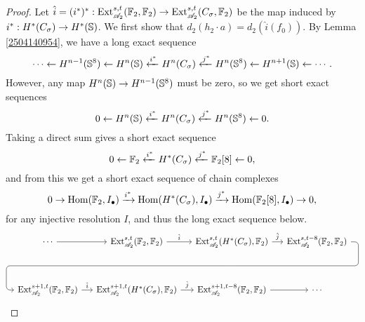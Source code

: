 \documentclass[11pt, titlepage]{article} %
\def\bb{\ensuremath\mathbb}
\def\A{\ensuremath{\mathscr{A}_2}}
\DeclareMathOperator{\Ext}{Ext}
\DeclareMathOperator{\Hom}{Hom}
\numberwithin{equation}{subsection}
\theoremstyle{plain}
\theoremstyle{definition}
\begin{document}
\begin{proof}
Let \(\hat i = (i^*)^* : \Ext_{\A}^{s,t}(\bb{F}_2, \bb{F}_2)\to \Ext_{\A}^{s,t}(C_\sigma, \bb{F}_2)\) be the map induced by \(i^* : H^*(C_\sigma)\to H^*(\bb{S})\). %
We first show that \(d_2(h_2\cdot a)=d_2(\hat i(f_0))\). By Lemma \ref{2504140954}, we have a long exact sequence
\[\cdots \leftarrow H^{n-1}(\bb{S}^8) \leftarrow H^n(\bb{S}) \xleftarrow{i^*} H^n(C_\sigma) \xleftarrow{j^*} H^n(\bb{S}^8)\leftarrow H^{n+1}(\bb{S}) \leftarrow \cdots.\]
However, any map \(H^n(\bb{S})\to H^{n-1}(\bb{S}^8)\) must be zero, so we get short exact sequences 
\[0 \leftarrow H^n(\bb{S})\xleftarrow{i^*} H^n(C_\sigma) \xleftarrow{j^*} H^n(\bb{S}^8)\leftarrow 0.\]
Taking a direct sum gives a short exact sequence
\[0 \leftarrow \bb{F}_2 \xleftarrow{i^*} H^*(C_\sigma) \xleftarrow{j^*} \bb{F}_2[8] \leftarrow 0,\]
and from this we get a short exact sequence of chain complexes
\[0 \to \Hom(\bb{F}_2, I_\bullet) \xrightarrow{i^*} \Hom(H^*(C_\sigma), I_\bullet) \xrightarrow{j^*} \Hom(\bb{F}_2[8], I_\bullet)\to 0,\]
for any injective resolution \(I\), and thus the long exact sequence below.
\[\begin{tikzcd}[row sep=8ex, column sep=3ex]
\cdots \arrow[r, ""] & \Ext_{\A}^{s,t}(\bb{F}_2, \bb{F}_2) \arrow[r, "\hat i"] & \Ext_{\A}^{s,t}(H^*(C_\sigma), \bb{F}_2) \arrow[r, "\hat j"] \arrow[draw=none]{d}[name=ar, anchor=center]{} & \Ext_{\A}^{s,t-8}(\bb{F}_2, \bb{F}_2) \arrow[rounded corners, to path={ -- ([xshift=2ex]\tikztostart.east) |- (ar.center) \tikztonodes -| ([xshift=-2ex]\tikztotarget.west) -- (\tikztotarget)}]{dlll}[at end]{} \\
\Ext_{\A}^{s+1,t}(\bb{F}_2, \bb{F}_2) \arrow[r, "\hat i"] & \Ext_{\A}^{s+1,t}(H^*(C_\sigma), \bb{F}_2) \arrow[r, "\hat j"] & \Ext_{\A}^{s+1,t-8}(\bb{F}_2, \bb{F}_2) \arrow[r, ""] & \cdots
\end{tikzcd}\]


\end{proof}
\end{document}
